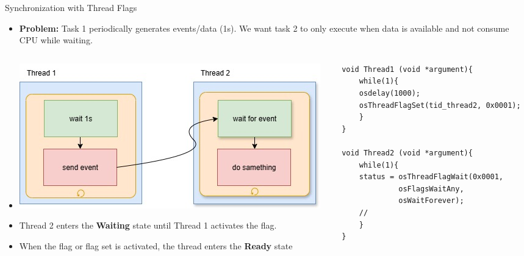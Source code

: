 \begin{frame}[fragile]{Synchronization with Thread Flags}
      \begin{itemize}
          \item \textbf{Problem:} Task 1 periodically generates events/data (1s). We want task 2 to only execute when data is available and not consume CPU while waiting.
      \end{itemize}
      \begin{columns}
            \begin{column}{0.50\textwidth}
                \begin{itemize}
                    \item[]
                    \includegraphics[scale=0.25]{presentation/flags.jpg}
                    \item Thread 2 enters the \textbf{Waiting} state until Thread 1 activates the flag.
                    \item When the flag or flag set is activated, the thread enters the \textbf{Ready} state
                \end{itemize}
            \end{column}
            \begin{column}{0.50\textwidth}
             \begin{verbatim}
void Thread1 (void *argument){
    while(1){
    osdelay(1000);
    osThreadFlagSet(tid_thread2, 0x0001);
    }
}

void Thread2 (void *argument){
    while(1){
    status = osThreadFlagWait(0x0001,
             osFlagsWaitAny,
             osWaitForever);
    //
    }
}
             \end{verbatim}

            \end{column}
     \end{columns}
\end{frame}

